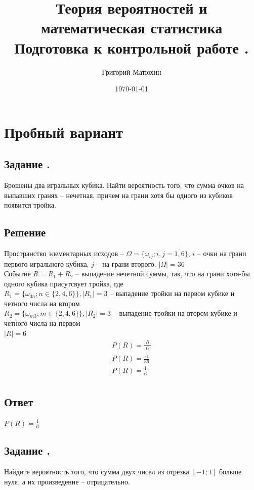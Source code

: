 \documentclass[12pt]{article}
\author{Григорий Матюхин}
\date{\today}
\title{
	Теория вероятностей и математическая статистика \\
	\large Подготовка к контрольной работе \textnumero1.
}
\begin{document}
\maketitle
\newpage
\tableofcontents
\newpage

\section{Пробный вариант}
\subsection{Задание .}
Брошены два игральных кубика. Найти вероятность того, что сумма очков на выпавших гранях -- нечетная, причем на грани хотя бы одного из кубиков появится тройка.
\subsection*{Решение}
Пространство элементарных исходов -- $\Omega = \{\omega_{ij}; i, j = \overline{1, 6}\}$, $i$ -- очки на грани первого игрального кубика, $j$ -- на грани второго. $|\Omega| = 36$ \\
Событие $R = R_1 + R_2$ -- выпадение нечетной суммы, так, что на грани хотя-бы одного кубика присутсвует тройка, где \\
$R_1 = \{\omega_{3n}; n \in \{2, 4, 6\}\}, |R_1| = 3$ -- выпадение тройки на первом кубике и четного числа на втором \\
$R_2 = \{\omega_{m3}; m \in \{2, 4, 6\}\}, |R_2| = 3$ -- выпадение тройки на втором кубике и четного числа на первом \\
$|R| = 6$ \\

\begin{gather*}
	P(R) = \frac{|R|}{|\Omega|} \\
	P(R) = \frac{6}{36} \\
	P(R) = \frac{1}{6} \\
\end{gather*}
\subsection*{Ответ}
$P(R) = \frac{1}{6}$

\newpage

\subsection{Задание .}
Найдите вероятность того, что сумма двух чисел из отрезка $[-1; 1]$ больше нуля, а их произведение -- отрицательно.
\end{document}
